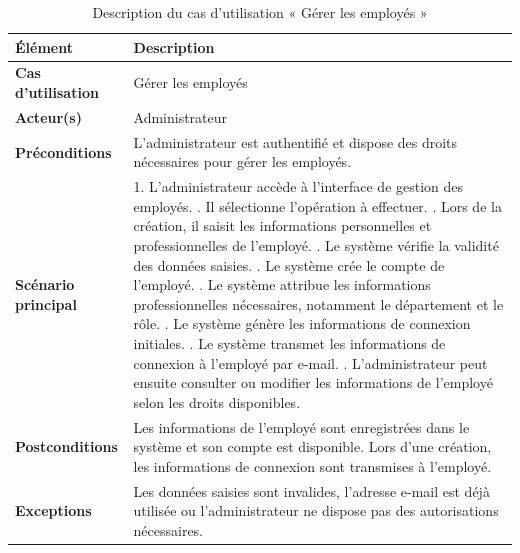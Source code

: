 \begin{longtable}{|>{\raggedright\arraybackslash}p{4cm}|>{\raggedright\arraybackslash}p{10.5cm}|}

\caption{Description du cas d’utilisation « Gérer les employés »}
\label{tab:uc4}\\

\hline

\textbf{Élément} & \textbf{Description} \\

\hline

\textbf{Cas d’utilisation} & Gérer les employés \\

\hline

\textbf{Acteur(s)} & Administrateur \\

\hline

\textbf{Préconditions} &
L'administrateur est authentifié et dispose des droits nécessaires pour gérer les employés. \\

\hline

\textbf{Scénario principal} &

1. L'administrateur accède à l'interface de gestion des employés. \newline
2. Il sélectionne l'opération à effectuer. \newline
3. Lors de la création, il saisit les informations personnelles et professionnelles de l'employé. \newline
4. Le système vérifie la validité des données saisies. \newline
5. Le système crée le compte de l'employé. \newline
6. Le système attribue les informations professionnelles nécessaires, notamment le département et le rôle. \newline
7. Le système génère les informations de connexion initiales. \newline
8. Le système transmet les informations de connexion à l'employé par e-mail. \newline
9. L'administrateur peut ensuite consulter ou modifier les informations de l'employé selon les droits disponibles. \\

\hline

\textbf{Postconditions} &
Les informations de l'employé sont enregistrées dans le système et son compte est disponible. Lors d'une création, les informations de connexion sont transmises à l'employé. \\

\hline

\textbf{Exceptions} &
Les données saisies sont invalides, l'adresse e-mail est déjà utilisée ou l'administrateur ne dispose pas des autorisations nécessaires. \\

\hline

\end{longtable}

